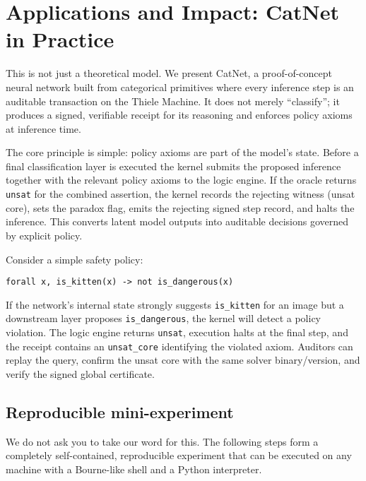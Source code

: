 \documentclass[11pt]{article}
\begin{document}
\section{Applications and Impact: CatNet in Practice}
This is not just a theoretical model. We present CatNet, a proof-of-concept neural network built from categorical primitives where every inference step is an auditable transaction on the Thiele Machine. It does not merely ``classify''; it produces a signed, verifiable receipt for its reasoning and enforces policy axioms at inference time.

The core principle is simple: policy axioms are part of the model's state. Before a final classification layer is executed the kernel submits the proposed inference together with the relevant policy axioms to the logic engine. If the oracle returns \texttt{unsat} for the combined assertion, the kernel records the rejecting witness (unsat core), sets the paradox flag, emits the rejecting signed step record, and halts the inference. This converts latent model outputs into auditable decisions governed by explicit policy.

Consider a simple safety policy:
\begin{verbatim}
forall x, is_kitten(x) -> not is_dangerous(x)
\end{verbatim}
If the network's internal state strongly suggests \texttt{is\_kitten} for an image but a downstream layer proposes \texttt{is\_dangerous}, the kernel will detect a policy violation. The logic engine returns \texttt{unsat}, execution halts at the final step, and the receipt contains an \texttt{unsat\_core} identifying the violated axiom. Auditors can replay the query, confirm the unsat core with the same solver binary/version, and verify the signed global certificate.

\subsection{Reproducible mini-experiment}
We do not ask you to take our word for this. The following steps form a completely self-contained, reproducible experiment that can be executed on any machine with a Bourne-like shell and a Python interpreter.
\end{document}
